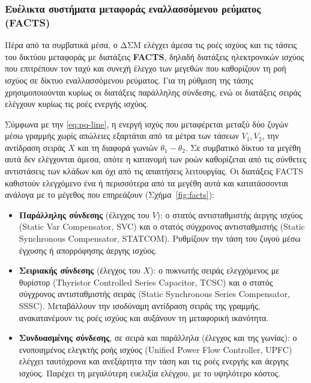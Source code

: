 \subsubsection{Ευέλικτα συστήματα μεταφοράς εναλλασσόμενου ρεύματος (FACTS)}
\label{sec:facts}

Πέρα από τα συμβατικά μέσα, ο ΔΣΜ ελέγχει άμεσα τις ροές ισχύος και τις τάσεις του δικτύου
μεταφοράς με διατάξεις \textbf{FACTS}, δηλαδή διατάξεις ηλεκτρονικών ισχύος που επιτρέπουν τον
ταχύ και συνεχή έλεγχο των μεγεθών που καθορίζουν τη ροή ισχύος σε δίκτυο εναλλασσόμενου
ρεύματος. Για τη ρύθμιση της τάσης χρησιμοποιούνται κυρίως οι διατάξεις παράλληλης σύνδεσης,
ενώ οι διατάξεις σειράς ελέγχουν κυρίως τις ροές ενεργής ισχύος.

Σύμφωνα με την \eqref{eq:pq-line}, η ενεργή ισχύς που μεταφέρεται μεταξύ δύο ζυγών μέσω
γραμμής χωρίς απώλειες εξαρτάται από τα μέτρα των τάσεων $V_1, V_2$, την αντίδραση σειράς
$X$ και τη διαφορά γωνιών $\theta_1 - \theta_2$. Σε
συμβατικό δίκτυο τα μεγέθη αυτά δεν ελέγχονται άμεσα, οπότε η κατανομή των ροών καθορίζεται
από τις σύνθετες αντιστάσεις των κλάδων και όχι από τις απαιτήσεις λειτουργίας. Οι διατάξεις
FACTS καθιστούν ελεγχόμενο ένα ή περισσότερα από τα μεγέθη αυτά και κατατάσσονται ανάλογα με
το μέγεθος που επηρεάζουν (Σχήμα~\ref{fig:facts}):

\begin{itemize}
\item \textbf{Παράλληλης σύνδεσης} (έλεγχος του $V$): ο στατός αντισταθμιστής άεργης ισχύος
      (Static Var Compensator, SVC) και ο στατός σύγχρονος αντισταθμιστής (Static
      Synchronous Compensator, STATCOM). Ρυθμίζουν την τάση του ζυγού μέσω έγχυσης ή
      απορρόφησης άεργης ισχύος.
\item \textbf{Σειριακής σύνδεσης} (έλεγχος του $X$): ο πυκνωτής σειράς ελεγχόμενος με
      θυρίστορ (Thyristor Controlled Series Capacitor, TCSC) και ο στατός σύγχρονος
      αντισταθμιστής σειράς (Static Synchronous Series Compensator, SSSC). Μεταβάλλουν την
      ισοδύναμη αντίδραση σειράς της γραμμής, ανακατανέμουν τις ροές ισχύος και αυξάνουν τη
      μεταφορική ικανότητα.
\item \textbf{Συνδυασμένης σύνδεσης}, σε σειρά και παράλληλα (έλεγχος και της γωνίας): ο
      ενοποιημένος ελεγκτής ροής ισχύος (Unified Power Flow Controller, UPFC) ελέγχει
      ταυτόχρονα και ανεξάρτητα την τάση και τις ροές ενεργής και άεργης ισχύος. Παρέχει τη
      μεγαλύτερη ευελιξία ελέγχου, με το υψηλότερο κόστος.
\end{itemize}

